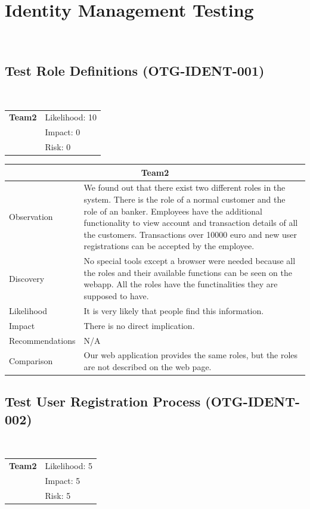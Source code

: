 \documentclass[headsepline,footsepline,footinclude=false,oneside,fontsize=11pt,paper=a4,listof=totoc,bibliography=totoc]{scrbook} %
\begin{document}
\pagebreak
\section{Identity Management Testing}\
\subsection{Test Role Definitions (OTG-IDENT-001)}\
\begin{tabular}{cR{12cm}}
	\textbf{Team2} & Likelihood: 10\\& Impact: 0\\& Risk: 0
\end{tabular}

\begin{tabular}{ l|p{11cm}  }
	\hline
	\multicolumn{2}{c}{\textbf{Team2}} \\
	\hline
	Observation   & We found out that there exist two different roles in the system. There is the role of a normal customer and the role of an banker. Employees have the additional functionality to view account and transaction details of all the customers. Transactions over 10000 euro and new user registrations can be accepted by the employee.\\
	Discovery  & No special tools except a browser were needed because all the roles and their available functions can be seen on the webapp. All the roles have the functinalities they are supposed to have. \\
	Likelihood & It is very likely that people find this information. \\
	Impact    & There is no direct implication. \\
	Recommendations & N/A \\
	Comparison & Our web application provides the same roles, but the roles are not described on the web page. \\
	\hline
\end{tabular}
 
\pagebreak

\subsection{Test User Registration Process (OTG-IDENT-002)}\
\begin{tabular}{cR{12cm}}
	\textbf{Team2} & Likelihood: 5\\& Impact: 5\\& Risk: 5
\end{tabular}
\end{document}
